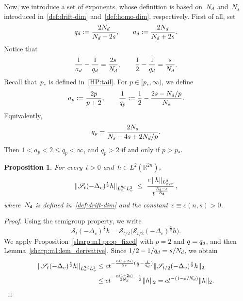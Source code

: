 \documentclass[leqno,10pt]{amsart}
\theoremstyle{plain}
\newtheorem{prop}{Proposition}[section]
\theoremstyle{remark}
\numberwithin{equation}{section}
\def\er{\mathbb{R}}
\begin{document}
{Now, we introduce a set of exponents, whose definition is based on~$N_{\rm d}$ and~$N_s$ introduced in~\eqref{def:drift-dim} and~\eqref{def:homo-dim}, respectively. First of all, set
\begin{equation}\label{sharp:eq_drift_exponents}
q_{\rm d}:=\frac{2N_{\rm d}}{N_{\rm d}-2s},
\qquad
a_{\rm d}:=\frac{2N_{\rm d}}{N_{\rm d}+2s}.
\end{equation}
Notice that
\begin{equation}\label{sharp:m1:eq_drift_rel}
\frac1{a_{\rm d}}-\frac1{q_{\rm d}}=\frac{2s}{N_{\rm d}},
\qquad
\frac12-\frac1{q_{\rm d}}=\frac{s}{N_{\rm d}}.
\end{equation}
Recall that~$p_*$ is defined in~\eqref{HP:tail}.
For $p\in[p_*,\infty)$, we define
\begin{equation}\label{sharp:m1:eq_ap_qp}
a_p:=\frac{2p}{p+2},
\qquad
\frac1{q_p}:=\frac12-\frac{2s-N_{\rm d}/p}{N_s}.
\end{equation}
Equivalently,
\begin{equation}
\label{sharp:m1:eq_qp_formula}
q_p=\frac{2N_s}{N_s-4s+2N_{\rm d}/p}.
\end{equation}
Then $1<a_p<2\leq q_p<\infty$, and $q_p>2$ if and only if $p>p_*$.


\begin{prop}\label{sharp:m1:prop_fixed_negative}
For every~$t>0$ and~$h\in L^2(\er^{2n})$,
\begin{equation}
\label{sharp:m1:eq_fixed_negative}
\|\mathscr{S}_t(-\Delta_v)^\frac{s}{2}h\|_{L^{q_{\rm d}}_xL^2_v} \ \leq \ \frac{c\,\|h\|_{L^2_{x,v}}}{t^\frac{N_{\tt d}-s}{N_{\tt d}}}\,,
\end{equation}
where~$N_{\tt d}$ is defined in~\eqref{def:drift-dim} and the constant~$c\equiv c(n,s)>0$.
\end{prop}

\begin{proof}
Using the semigroup property, we write
$$
\mathscr{S}_t(-\Delta_v)^\frac{s}{2}h
=
\mathscr{S}_{t/2}\bigl(\mathscr{S}_{t/2}(-\Delta_v)^\frac{s}{2}h\bigr).
$$
We apply Proposition~\ref{sharp:m1:prop_fixed} with $p=2$ and $q=q_{\rm d}$, and then Lemma~\ref{sharp:m1:lem_derivative}. Since $1/2-1/q_{\rm d}=s/N_{\rm d}$, we obtain
\begin{align*}
\|\mathscr{S}_t(-\Delta_v)^\frac{s}{2}h\|_{L^{q_{\rm d}}_xL^2_v}
&\leq
ct^{-\frac{n(1+2s)}{2s}(\frac12-\frac1{q_{\rm d}})}
\|\mathscr{S}_{t/2}(-\Delta_v)^\frac{s}{2}h\|_2
\\
&\leq
ct^{-\frac{n(1+2s)}{2N_{\rm d}}-\frac12}\|h\|_2
=ct^{-(1-s/N_{\rm d})}\|h\|_2.
\end{align*}
\end{proof}

}
\end{document}
